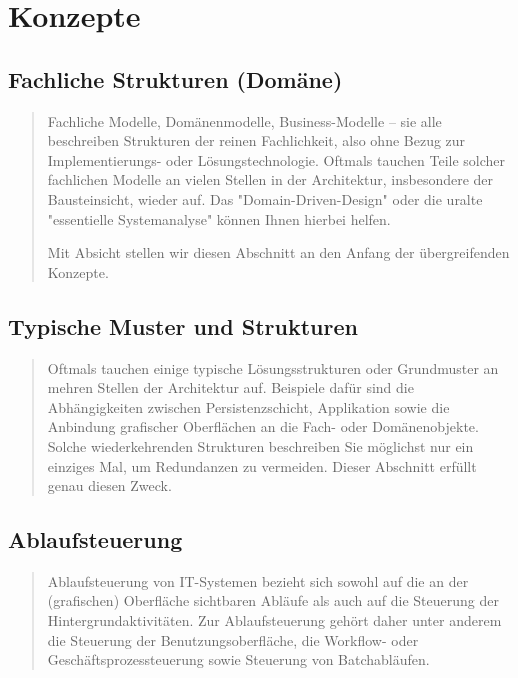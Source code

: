 \chapter{Konzepte}

\section{Fachliche Strukturen (Domäne)}

\begin{quote}
	Fachliche Modelle, Domänenmodelle, Business-Modelle – sie alle beschreiben Strukturen der reinen Fachlichkeit, also ohne Bezug zur Implementierungs- oder Lösungstechnologie.
	Oftmals tauchen Teile solcher fachlichen Modelle an vielen Stellen in der Architektur, insbesondere der Bausteinsicht, wieder auf. 
	Das "Domain-Driven-Design" oder die uralte "essentielle Systemanalyse" können Ihnen hierbei helfen.
	
	Mit Absicht stellen wir diesen Abschnitt an den Anfang der übergreifenden Konzepte.
\end{quote}

\section{Typische Muster und Strukturen}

\begin{quote}
	Oftmals tauchen einige typische Lösungsstrukturen oder Grundmuster an mehren Stellen der Architektur auf. Beispiele dafür sind die Abhängigkeiten zwischen Persistenzschicht, Applikation sowie die Anbindung grafischer Oberflächen an die Fach- oder Domänenobjekte. Solche wiederkehrenden Strukturen beschreiben Sie möglichst nur ein einziges Mal, um Redundanzen zu vermeiden. Dieser Abschnitt erfüllt genau diesen Zweck.
\end{quote}

\section{Ablaufsteuerung}

\begin{quote}
	Ablaufsteuerung von IT-Systemen bezieht sich sowohl auf die an der (grafischen) Oberfläche sichtbaren Abläufe als auch auf die Steuerung der Hintergrundaktivitäten. Zur Ablaufsteuerung gehört daher unter anderem die Steuerung der Benutzungsoberfläche, die Workflow- oder Geschäftsprozessteuerung sowie Steuerung von Batchabläufen.
\end{quote}

